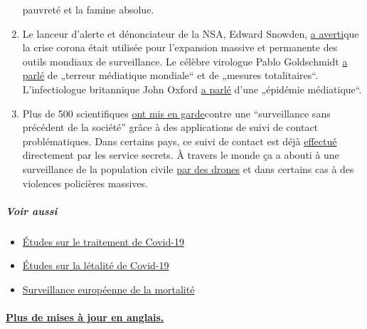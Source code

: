 \begin{enumerate}
  pauvreté et la famine absolue.
\item
  Le lanceur d'alerte et dénonciateur de la NSA, Edward Snowden,
  \href{https://www.youtube.com/watch?v=-pcQFTzck_c}{a averti}que la
  crise corona était utilisée pour l'expansion massive et permanente des
  outils mondiaux de surveillance. Le célèbre virologue Pablo
  Goldschmidt
  \href{https://www.rubikon.news/artikel/der-corona-totalitarismus}{a
  parlé} de „terreur médiatique mondiale`` et de „mesures
  totalitaires``. L'infectiologue britannique John Oxford
  \href{https://novuscomms.com/2020/03/31/a-view-from-the-hvivo-open-orphan-orph-laboratory-professor-john-oxford/}{a
  parlé} d'une „épidémie médiatique``.
\item
  Plus de 500 scientifiques
  \href{https://www.esat.kuleuven.be/cosic/sites/contact-tracing-joint-statement/}{ont
  mis en garde}contre une ``surveillance sans précédent de la société''
  grâce à des applications de suivi de contact problématiques. Dans
  certains pays, ce suivi de contact est déjà
  \href{https://www.jewishpress.com/news/the-courts/state-to-high-court-even-more-shin-bet-involvement-in-fighting-the-coronavirus/2020/04/14/}{effectué}
  directement par les service secrets. À travers le monde ça a abouti à
  une surveillance de la population civile
  \href{https://off-guardian.org/2020/04/25/50-headlines-darker-more-of-the-new-normal/}{par
  des drones} et dans certains cas à des violences policières massives.
\end{enumerate}

\hypertarget{voir-aussi}{%
\subparagraph{\texorpdfstring{\textbf{Voir
aussi}}{Voir aussi}}\label{voir-aussi}}

\begin{itemize}
\tightlist
\item
  \href{https://swprs.org/on-the-treatment-of-covid-19/}{Études sur le
  traitement de Covid-19}
\item
  \href{https://swprs.org/studies-on-covid-19-lethality/}{Études sur la
  létalité de Covid-19}
\item
  \href{http://euromomo.eu}{Surveillance européenne de la mortalité}
\end{itemize}

\hypertarget{plus-de-mises-uxe0-jour-en-anglais}{%
\paragraph{\texorpdfstring{\href{https://swprs.org/a-swiss-doctor-on-covid-19/}{Plus
de mises à jour en
anglais.}}{Plus de mises à jour en anglais.}}\label{plus-de-mises-uxe0-jour-en-anglais}}

